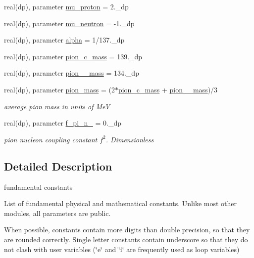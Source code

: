 \begin{DoxyCompactItemize}
\item 
real(dp), parameter \hyperlink{namespaceconstants_a895e65a76e6d376282dfe68349b71346}{mu\+\_\+proton} = 2.\+\_\+dp
\item 
real(dp), parameter \hyperlink{namespaceconstants_a50d3a5b790a40f8fa27b7119e24835d3}{mu\+\_\+neutron} = -\/1.\+\_\+dp
\item 
real(dp), parameter \hyperlink{namespaceconstants_ac62430db29fa548a130f2ba913b407f3}{alpha} = 1/137.\+\_\+dp
\item 
real(dp), parameter \hyperlink{namespaceconstants_a336fcf9a7d6a3f7ccfb4cb3b4757510e}{pion\+\_\+c\+\_\+mass} = 139.\+\_\+dp
\item 
real(dp), parameter \hyperlink{namespaceconstants_a27737907e81ada5ba3cff169aaad6377}{pion\+\_\+\_\+mass} = 134.\+\_\+dp
\item 
real(dp), parameter \hyperlink{namespaceconstants_afc100a7b1657caff60d09094b943d318}{pion\+\_\+mass} = (2$\ast$\hyperlink{namespaceconstants_a336fcf9a7d6a3f7ccfb4cb3b4757510e}{pion\+\_\+c\+\_\+mass} + \hyperlink{namespaceconstants_a27737907e81ada5ba3cff169aaad6377}{pion\+\_\+\_\+mass})/3
\begin{DoxyCompactList}\small\item\em average pion mass in units of MeV \end{DoxyCompactList}\item 
real(dp), parameter \hyperlink{namespaceconstants_a8aa189c0adcde5db078bbd208dd59c0c}{f\+\_\+pi\+\_\+n\+\_} = 0.\+\_\+dp
\begin{DoxyCompactList}\small\item\em pion nucleon coupling constant $ f^2 $. Dimensionless \end{DoxyCompactList}\end{DoxyCompactItemize}


\subsection{Detailed Description}
fundamental constants 

List of fundamental physical and mathematical constants. Unlike most other modules, all parameters are public.

When possible, constants contain more digits than double precision, so that they are rounded correctly. Single letter constants contain underscore so that they do not clash with user variables (\char`\"{}e\char`\"{} and \char`\"{}i\char`\"{} are frequently used as loop variables)

